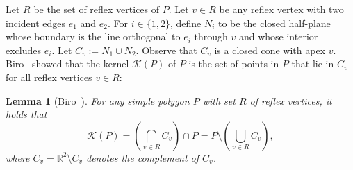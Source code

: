 \documentclass[11pt]{article}
\newcommand{\Plane}{\ensuremath{\mathbb{R}^2}}
\newcommand{\Kernel}{\mathcal{K}}
\newtheorem{lemma}{Lemma}
\theoremstyle{definition}
\begin{document}
Let $R$ be the set of reflex vertices of $P$. Let $v\in R$ be any reflex vertex with
two incident edges $e_1$ and $e_2$. 
For $i \in \{1, 2\}$,
define $N_i$ to be the closed half-plane whose boundary is the line orthogonal to $e_i$ through $v$
and whose interior excludes $e_i$.
Let $C_v := N_1 \cup N_2$.
Observe that $C_v$ is a closed cone with apex $v$.
Biro~\cite[Theorem 5.2.8]{b-bbrg-13} showed that the kernel $\Kernel(P)$ of $P$
is the set of points in $P$ that lie in $C_v$ for all reflex vertices $v\in R$:
\begin{lemma}[Biro~\cite{b-bbrg-13}] \label{lem:kernel_biro}
 For any simple polygon $P$ with set $R$ of reflex vertices, it holds that
 \[ \Kernel(P) = \left(\bigcap_{v\in R} C_v\right) \cap P = P\setminus \left(\bigcup_{v\in R}\overline{C_v} \right),\]
 where $\overline{C_v} = \Plane \setminus C_v$ denotes the complement of $C_v$. 
\end{lemma}
\end{document}
